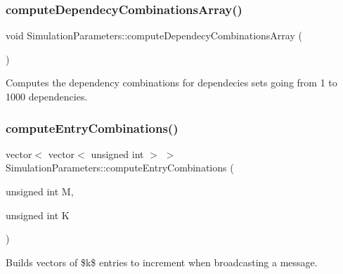 \mbox{\label{class_simulation_parameters_a09bec9dc793646bd71f610eee824dc21}} 
\subsubsection{\texorpdfstring{compute\+Dependecy\+Combinations\+Array()}{computeDependecyCombinationsArray()}}
{\footnotesize\ttfamily void Simulation\+Parameters\+::compute\+Dependecy\+Combinations\+Array (\begin{DoxyParamCaption}{ }\end{DoxyParamCaption})\hspace{0.3cm}{\ttfamily [protected]}}



Computes the dependency combinations for dependecies sets going from 1 to 1000 dependencies. 

\mbox{\label{class_simulation_parameters_ae665fb3295f28d46514597f88c690d4a}} 
\subsubsection{\texorpdfstring{compute\+Entry\+Combinations()}{computeEntryCombinations()}}
{\footnotesize\ttfamily vector$<$ vector$<$ unsigned int $>$ $>$ Simulation\+Parameters\+::compute\+Entry\+Combinations (\begin{DoxyParamCaption}\item[{unsigned int}]{M,  }\item[{unsigned int}]{K }\end{DoxyParamCaption})\hspace{0.3cm}{\ttfamily [protected]}}



Builds vectors of \$k\$ entries to increment when broadcasting a message. 

